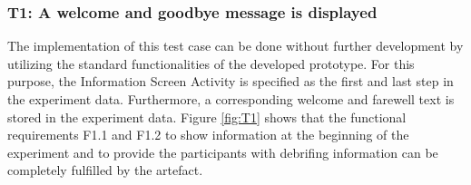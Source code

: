 
\subsubsection*{T1: A welcome and goodbye message is displayed} 

The implementation of this test case can be done without further development by utilizing the standard functionalities of the developed prototype. For this purpose, the Information Screen Activity is specified as the first and last step in the experiment data. Furthermore, a corresponding welcome and farewell text is stored in the experiment data. Figure \ref{fig:T1} shows that the functional requirements F1.1 and F1.2 to show information at the beginning of the experiment and to provide the participants with debrifing information can be completely fulfilled by the artefact.

